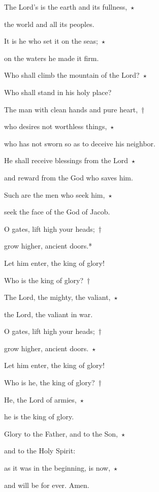 \noindent The Lord’s is the earth and its fullness,~$\star$~\nopagebreak

the world and all its peoples.

\noindent It is he who set it on the seas;~$\star$~\nopagebreak

on the waters he made it firm.

\noindent Who shall climb the mountain of the Lord?~$\star$~\nopagebreak

Who shall stand in his holy place?

\noindent The man with clean hands and pure heart,~†~\nopagebreak

who desires not worthless things,~$\star$~\nopagebreak

who has not sworn so as to deceive his neighbor.

\noindent He shall receive blessings from the Lord~$\star$~\nopagebreak

and reward from the God who saves him.

\noindent Such are the men who seek him,~$\star$~\nopagebreak

seek the face of the God of Jacob.

\noindent O gates, lift high your heads;~†~\nopagebreak

grow higher, ancient doors.*

Let him enter, the king of glory!

\noindent Who is the king of glory?~†~\nopagebreak

The Lord, the mighty, the valiant,~$\star$~\nopagebreak

the Lord, the valiant in war.

\noindent O gates, lift high your heads;~†~\nopagebreak

grow higher, ancient doors.~$\star$~\nopagebreak

Let him enter, the king of glory!

\noindent Who is he, the king of glory?~†~\nopagebreak

He, the Lord of armies,~$\star$~\nopagebreak

he is the king of glory.

\noindent Glory to the Father, and to the Son,~$\star$~\nopagebreak

and to the Holy Spirit:

\noindent as it was in the beginning, is now,~$\star$~\nopagebreak

and will be for ever. Amen.